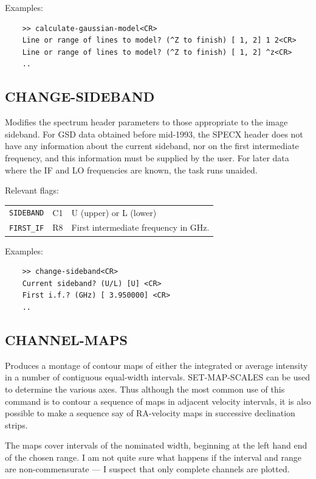 \documentclass[11pt,twoside]{report}
\begin{document}
Examples:
\begin{verbatim}
    >> calculate-gaussian-model<CR>
    Line or range of lines to model? (^Z to finish) [ 1, 2] 1 2<CR>
    Line or range of lines to model? (^Z to finish) [ 1, 2] ^z<CR>
    ..
\end{verbatim}

\subsection{CHANGE-SIDEBAND} 

Modifies the spectrum header parameters to those appropriate to the image
sideband. For GSD data obtained before mid-1993, the SPECX header does not have
any information about the current sideband, nor on the first intermediate
frequency, and this information must be supplied by the user. For later data
where the IF and LO frequencies are known, the task runs unaided.

Relevant flags:\\
\begin{tabular}{lll}
  \verb+SIDEBAND+ & C1 & U (upper) or L (lower) \\
  \verb+FIRST_IF+ & R8 & First intermediate frequency in GHz.
\end{tabular}

Examples:
\begin{verbatim}
    >> change-sideband<CR>
    Current sideband? (U/L) [U] <CR>
    First i.f.? (GHz) [ 3.950000] <CR>
    ..
\end{verbatim}

\subsection{CHANNEL-MAPS} 

Produces a montage of contour maps of either the integrated or average
intensity in a number of contiguous equal-width intervals. SET-MAP-SCALES
can be used to determine the various axes. Thus although the most common
use of this command is to contour a sequence of maps in adjacent velocity
intervals, it is also possible to make a sequence say of RA-velocity maps
in successive declination strips.

The maps cover intervals of the nominated width, beginning at the left hand end
of the chosen range. I am not quite sure what happens if the interval and range
are non-commensurate --- I suspect that only complete channels are plotted. 
\end{document}

